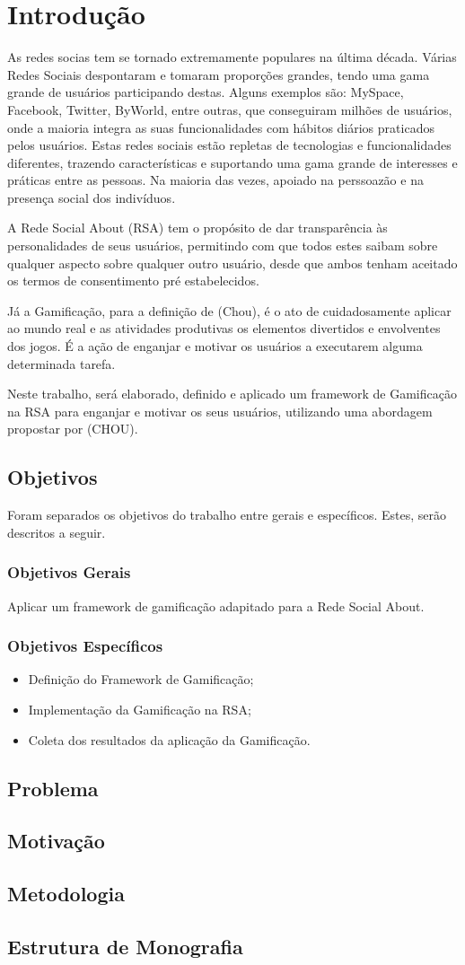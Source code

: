\chapter[Introdução]{Introdução}
As redes socias tem se tornado extremamente populares na última década.
Várias
Redes Sociais despontaram e tomaram proporções grandes, tendo uma gama grande
de usuários participando destas. Alguns exemplos são: MySpace, Facebook, Twitter,
ByWorld, entre outras, que conseguiram milhões de usuários, onde a maioria integra
as suas funcionalidades com hábitos diários praticados pelos usuários.
Estas redes sociais estão repletas de tecnologias e funcionalidades diferentes,
trazendo características e suportando uma gama grande de interesses e práticas
entre as pessoas. Na maioria das vezes, apoiado na perssoazão e na presença social
dos indivíduos.

A Rede Social About (RSA) tem o propósito de dar transparência às personalidades de seus usuários, permitindo com que todos
estes saibam sobre qualquer aspecto sobre qualquer outro usuário, desde que ambos tenham aceitado os
termos de consentimento pré estabelecidos.

Já a Gamificação, para a definição de (Chou),  é o ato de cuidadosamente aplicar ao mundo
real e as atividades produtivas os elementos divertidos e envolventes dos jogos.
É a ação de enganjar e motivar os usuários a executarem alguma determinada
tarefa. 

Neste trabalho, será elaborado, definido e aplicado um framework de Gamificação na RSA 
para enganjar e motivar os seus usuários, utilizando uma abordagem propostar por (CHOU).


\section{Objetivos}
Foram separados os objetivos do trabalho entre gerais e específicos. Estes, serão
descritos a seguir.
\subsection{Objetivos Gerais}
Aplicar um framework de  gamificação adapitado para a Rede Social About.
\subsection{Objetivos Específicos}
\begin{itemize}
    \item Definição do Framework de Gamificação;
    \item Implementação da Gamificação na RSA;
    \item Coleta dos resultados da aplicação da Gamificação.
\end{itemize}
\section{Problema}
\section{Motivação}
\section{Metodologia}
\section{Estrutura de Monografia}
